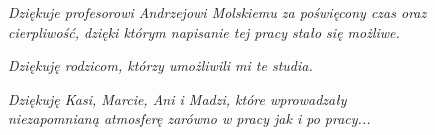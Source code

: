 {\vspace*{\fill}
\begin{flushright}
\textit{Dziękuje profesorowi Andrzejowi Molskiemu za poświęcony czas oraz \\ cierpliwość, dzięki którym napisanie tej pracy stało się możliwe. }
\end{flushright}
\setlength{\parskip}{1cm}
\begin{flushright}
\textit{Dziękuję rodzicom, którzy umożliwili mi te studia.}
\setlength{\parskip}{1cm}
\end{flushright}
\setlength{\parskip}{1cm}
\begin{flushright}
\textit{Dziękuję Kasi, Marcie, Ani i Madzi, które wprowadzały \\ niezapomnianą atmosferę zarówno w pracy jak i po pracy...}
\end{flushright}}

